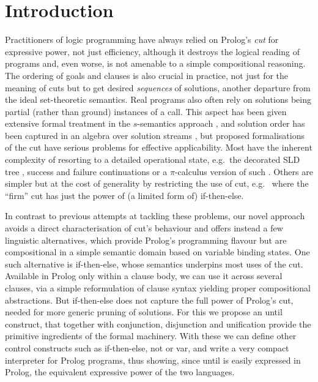 \documentclass{tlp}
\def\mite{\textsf{if-then-else}}
\begin{document}
\section{Introduction}

Practitioners of logic programming have always relied on Prolog's \emph{cut} for
expressive power, not just efficiency, although it destroys the logical reading
of programs and, even worse, is not amenable to a simple compositional reasoning.
The ordering of goals and clauses is also crucial in practice, not just for the
meaning of cuts but to get desired \emph{sequences} of solutions, another
departure from the ideal set-theoretic semantics. Real programs also often rely
on solutions being partial (rather than ground) instances of a call. This aspect
has been given extensive formal treatment in the $s$-semantics approach
\cite{bo_ga_:94:ssata}, and solution order has been captured in an algebra over
solution streams \cite{se_sp_ho:99:alp}, but proposed formalisations of the cut
have serious problems for effective applicability. Most have the inherent
complexity of resorting to a detailed operational state, e.g.\ the decorated SLD
tree \cite{de_mi:88:dosp,sp:00:ogidspc}, success and failure continuations
\cite{dBr_dVi:89:cspc} or a $\pi$-calculus version of such
\cite{li:94:pcsp}. Others are simpler but at the cost of generality by
restricting the use of cut, e.g.\ \cite{And:03:wpspc} where the ``firm'' cut has
just the power of (a limited form of) \mite{}.

In contrast to previous attempts at tackling these problems, our novel approach
avoids a direct characterisation of cut's behaviour and offers instead a few 
linguistic alternatives, which provide Prolog's programming flavour but are
compositional in a simple semantic domain based on variable binding states. One
such alternative is \textsf{if-then-else}, whose semantics
underpins most uses of the cut. Available in Prolog
only within a clause body, we can use it across several clauses,
via a simple reformulation of clause syntax yielding proper compositional
abstractions. But \textsf{if-then-else} does not capture the full power of
Prolog's cut, needed for more generic pruning of solutions. For this we
propose an \textsf{until} construct, that together with conjunction, disjunction
and unification provide the primitive ingredients of the formal machinery. With
these we can define other control constructs such as \textsf{if-then-else},
\textsf{not} or \textsf{var}, and write a very compact interpreter for Prolog
programs, thus showing, since \textsf{until} is easily expressed in Prolog, the
equivalent expressive power of the two languages.
\end{document}
